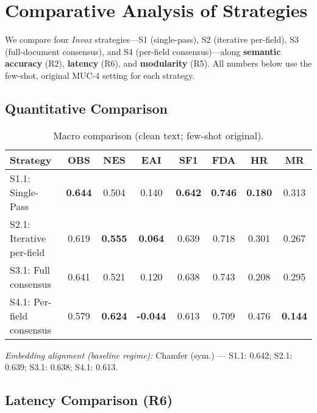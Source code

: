 \section{Comparative Analysis of Strategies}
\label{sec:eval-comparative}

We compare four \textit{Invox} strategies—S1 (single-pass), S2 (iterative per-field), S3 (full-document consensus), and S4 (per-field consensus)—along \textbf{semantic accuracy} (R2), \textbf{latency} (R6), and \textbf{modularity} (R5). 
All numbers below use the few-shot, original MUC-4 setting for each strategy.

\subsection*{Quantitative Comparison}

\begin{table}[h]
    \centering
    \caption{Macro comparison (clean text; few-shot original).}
    \label{tab:strategy-comparison}
    \begin{tabular}{lccccccc}
        \toprule
        Strategy & OBS & NES & EAI & SF1 & FDA & HR & MR \\
        \midrule
        S1.1: Single-Pass          & \textbf{0.644} & 0.504 & 0.140 & \textbf{0.642} & \textbf{0.746} & \textbf{0.180} & 0.313 \\
        S2.1: Iterative per-field  & 0.619 & \textbf{0.555} & \textbf{0.064} & 0.639 & 0.718 & 0.301 & 0.267 \\
        S3.1: Full consensus       & 0.641 & 0.521 & 0.120 & 0.638 & 0.743 & 0.208 & 0.295 \\
        S4.1: Per-field consensus  & 0.579 & \textbf{0.624} & \textbf{-0.044} & 0.613 & 0.709 & 0.476 & \textbf{0.144} \\
        \bottomrule
    \end{tabular}
\end{table}

\noindent\textit{Embedding alignment (baseline regime):} Chamfer (sym.) — S1.1: 0.642; S2.1: 0.639; S3.1: 0.638; S4.1: 0.613.

\subsection*{Latency Comparison (R6)}

